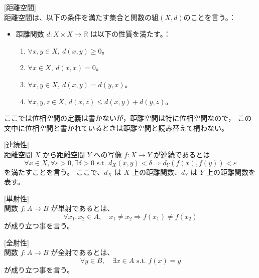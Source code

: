 \documentclass[uplatex]{jsarticle}
\begin{document}
\begin{definition}\label{Def:metric space}[距離空間]\\
    距離空間は、以下の条件を満たす集合と関数の組$(X, d)$のことを言う。：
    \begin{itemize}
        \item 距離関数 $d : X \times X \to \mathbb{R}$ は以下の性質を満たす。：
              \begin{enumerate}
                  \item $\forall x, y \in X, \ d(x, y) \geq 0$。
                  \item $\forall x \in X, \ d(x, x) = 0$。
                  \item $\forall x, y \in X, \ d(x, y) = d(y, x)$。
                  \item $\forall x, y, z \in X, \ d(x, z) \leq d(x, y) + d(y, z)$。
              \end{enumerate}
    \end{itemize}
    ここでは位相空間の定義は書かないが，距離空間は特に位相空間なので，
    この文中に位相空間と書かれているときは距離空間と読み替えて構わない。
\end{definition}

\begin{definition}\label{Def:continuity}[連続性]\\
    距離空間 \(X\) から距離空間 \(Y\) への写像 \(f: X \rightarrow Y\) が連続であるとは
    \[
        \forall x \in X, \forall \varepsilon > 0, \exists \delta > 0 \text{  s.t.  } d_X(x, y) < \delta \Rightarrow d_Y(f(x), f(y)) < \varepsilon
    \]
    を満たすことを言う。
    ここで、\(d_X\) は \(X\) 上の距離関数、\(d_Y\) は \(Y\) 上の距離関数を表す。

\end{definition}

\begin{definition}\label{Def:injection}[単射性]\\
    関数 \(f: A \rightarrow B\) が単射であるとは、
    \[
        \forall x_1, x_2 \in A, \quad x_1 \neq x_2 \Rightarrow f(x_1) \neq f(x_2)
    \]
    が成り立つ事を言う。
\end{definition}

\begin{definition}\label{Def:surjection}[全射性]\\
    関数 \(f: A \rightarrow B\) が全射であるとは、
    \[
        \forall y \in B, \quad \exists x \in A \text{  s.t.  } f(x) = y
    \]
    が成り立つ事を言う。
\end{definition}
\end{document}
